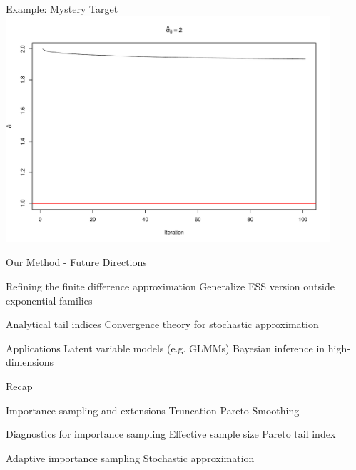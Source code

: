 \documentclass[14pt]{beamer}
\begin{document}
\begin{frame}{Example: Mystery Target}
    \centering
    \includegraphics[height=0.9\textheight, width=0.9\textwidth, keepaspectratio]{Figures/k_hat Traj - 2.pdf}
\end{frame}

\begin{frame}{Our Method - Future Directions}
    \begin{outline}
        \1 Refining the finite difference approximation
            \2 Generalize ESS version outside exponential families \newline

        \1 Analytical tail indices
        \1 Convergence theory for stochastic approximation \newline

        \1 Applications
            \2 Latent variable models (e.g. GLMMs)
            \2 Bayesian inference in high-dimensions
    \end{outline}
\end{frame}


\begin{frame}{Recap}
    \begin{outline}
        \1 Importance sampling and extensions
            \2 Truncation
            \2 Pareto Smoothing \newline
        
        \1 Diagnostics for importance sampling
            \2 Effective sample size
            \2 Pareto tail index \newline

        \1 Adaptive importance sampling
            \2 Stochastic approximation
    \end{outline}
\end{frame}
\end{document}
